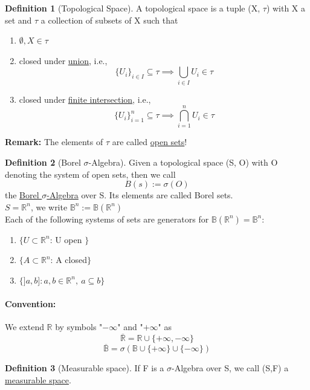 \documentclass[10pt,a4paper]{article}
\theoremstyle{definition}
\newtheorem{definition}{Definition}[part]
\theoremstyle{plain}
\begin{document}
\begin{definition}[Topological Space]
A topological space is a tuple (X, $\tau$) with X a set and $\tau$ a collection of subsets of X such that
	\begin{enumerate}
		\item $\emptyset, X \in \tau$
		\item closed under \underline{union}, i.e.,\\
		 $$ \{ U_i \}_{i \in I} \subseteq \tau \implies \bigcup_{i \in I} U_i \in \tau$$
		\item closed under \underline{finite intersection}, i.e., \\
			$$\{ U_i \}_{i = 1}^n \subseteq \tau \implies \bigcap_{i = 1}^{n} U_i \in \tau$$
	\end{enumerate}
\textbf{Remark:} The elements of $\tau$ are called \underline{open sets}!
\end{definition}

\begin{definition}[Borel $\sigma$-Algebra]
	Given a topological space (S, O) with O denoting the system of open sets, then we call
	$$B(s) := \sigma(O)$$
	the \underline{Borel $\sigma$-Algebra} over S. Its elements are called Borel sets.\\
	$ S = \mathbb{R}^n$, we write $\mathbb{B}^n := \mathbb{B}(\mathbb{R}^n)$\\
	
	Each of the following systems of sets are generators for $\mathbb{B}(\mathbb{R}^n) = \mathbb{B}^n$:
	\begin{enumerate}
		\item $\{U \subset \mathbb{R}^n$: U open $\}$
		\item $\{A \subset \mathbb{R}^n$: A closed$\}$
		\item $\big\{ ]a,b ] : a, b\in \mathbb{R}^n,\ a\subseteq b \big\} $
	\end{enumerate}
\end{definition}

\paragraph{Convention:} We extend $\mathbb{R}$ by symbols "$-\infty$" and "$+\infty$" as\\
	$$ \overline{\mathbb{R}} = \mathbb{R} \cup \{+\infty, -\infty\} $$
	$$ \overline{\mathbb{B}} = \sigma(\mathbb{B} \cup \{+\infty\} \cup \{-\infty\} )$$

\begin{definition}[Measurable space]
	\label{Measurable_Space}
	If F is a $\sigma$-Algebra over S, we call (S,F) a \underline{measurable space}. 
\end{definition}
\end{document}
